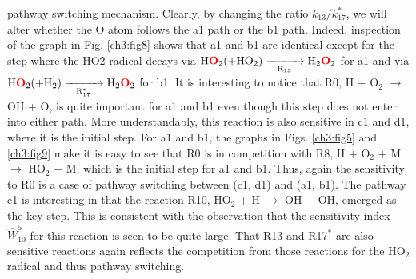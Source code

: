 pathway switching mechanism. Clearly, by changing the ratio
$k_{13}/k_{17}^{\ast}$, we will alter whether the O atom follows the a1 path
or the b1 path. Indeed, inspection of the graph in Fig. \ref{ch3:fig8}
shows that a1 and b1 are identical except for the step where the
HO2 radical decays via $\text{H}\textcolor{red}{\textbf{O}}_2 (+\text{HO}_2) \xrightarrow[\text{R}_{13}]{\makebox[1cm]{}} \text{H}_2\textcolor{red}{\textbf{O}}_2$ for a1 and
via $\text{H}\textcolor{red}{\textbf{O}}_2 (+\text{H}_2) \xrightarrow[\text{R}_{17}^{*}]{\makebox[1cm]{}} \text{H}_2\textcolor{red}{\textbf{O}}_2$ for b1. It is interesting to notice
that R0, H + O$_2$ $\rightarrow$ OH + O, is quite important for a1 and b1
even though this step does not enter into either path. More
understandably, this reaction is also sensitive in c1 and d1,
where it is the initial step. For a1 and b1, the graphs in Figs.
\ref{ch3:fig5} and \ref{ch3:fig9} make it is easy to see that R0 is in competition with R8,
H + O$_2$ + M $\rightarrow$ HO$_2$ + M, which is the initial step for a1 and
b1. Thus, again the sensitivity to R0 is a case of pathway
switching between (c1, d1) and (a1, b1). The pathway e1 is
interesting in that the reaction R10, HO$_2$ + H $\rightarrow$ OH + OH,
emerged as the key step. This is consistent with the observation
that the sensitivity index ${\widehat{W}}_{10}^{5}$ for this reaction is seen to be
quite large. That R13 and R17$^{\ast}$ are also sensitive reactions
again reflects the competition from those reactions for the HO$_2$
radical and thus pathway switching.
\newline
